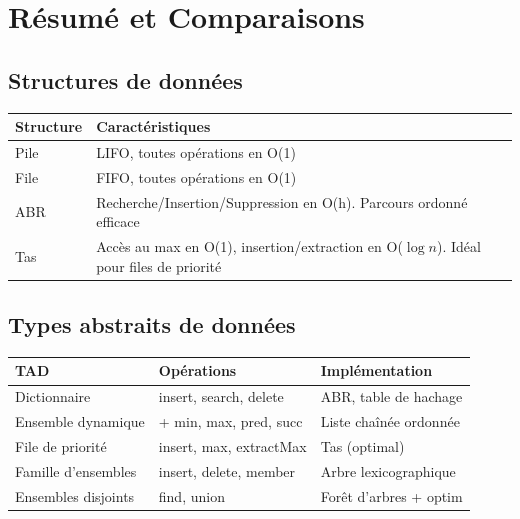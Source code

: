 \documentclass[12pt,a4paper]{article}
\begin{document}
\newpage
\section{Résumé et Comparaisons}

\subsection{Structures de données}

\begin{center}
\colorbox{fondvert!20}{
\begin{tabular}{|l|p{8cm}|}
\hline
\rowcolor{defvert!30}
\textbf{Structure} & \textbf{Caractéristiques} \\
\hline
Pile & \textcolor{importantrouge}{LIFO}, toutes opérations en \textcolor{defvert}{O(1)} \\
\hline
File & \textcolor{importantrouge}{FIFO}, toutes opérations en \textcolor{defvert}{O(1)} \\
\hline
ABR & Recherche/Insertion/Suppression en \textcolor{algoviolet}{O(h)}. Parcours ordonné efficace \\
\hline
Tas & Accès au max en \textcolor{defvert}{O(1)}, insertion/extraction en \textcolor{algoviolet}{O($\log n$)}. Idéal pour files de priorité \\
\hline
\end{tabular}}
\end{center}

\subsection{Types abstraits de données}

\begin{center}
\colorbox{fondbleu}{
\begin{tabular}{|l|l|p{4.5cm}|}
\hline
\rowcolor{titrebleu!30}
\textbf{TAD} & \textbf{Opérations} & \textbf{Implémentation} \\
\hline
Dictionnaire & insert, search, delete & ABR, table de hachage \\
\hline
Ensemble dynamique & + min, max, pred, succ & Liste chaînée ordonnée \\
\hline
File de priorité & insert, max, extractMax & \textcolor{defvert}{Tas (optimal)} \\
\hline
Famille d'ensembles & insert, delete, member & Arbre lexicographique \\
\hline
Ensembles disjoints & find, union & Forêt d'arbres + optim \\
\hline
\end{tabular}}
\end{center}
\end{document}
